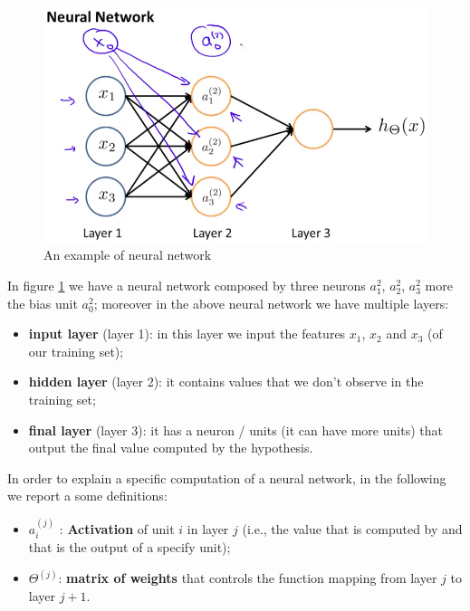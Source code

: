  
\begin{figure}[H]
\begin{center}
\includegraphics[scale=0.25]{images/neurnet}
\end{center}
\caption{An example of neural network} 
\label{fig:neurnet}
\end{figure}

In figure \ref{fig:neurnet} we have a neural network composed by three neurons $a_1^{2}$, $a_2^{2}$, $a_3^{2}$  more the bias unit $a_0^{2}$; moreover in the above neural network we have multiple layers:

\begin{itemize}
\item {\bf input layer} (layer 1): in this layer we input the features $x_1$, $x_2$ and $x_3$ (of our training set);
\item {\bf hidden layer} (layer 2): it contains values that we don't observe in the training set;
\item {\bf final layer} (layer 3): it has a neuron / units (it can have more units) that output the final value computed by the hypothesis.
\end{itemize}

In order to explain a specific computation of a neural network, in the following we report a some definitions:
\begin{itemize}
\item {\bf $a_i^{(j)}$} : {\bf Activation} of unit $i$ in layer $j$ (i.e., the value that is computed by and that is the output of a specify unit);
\item {\bf $\Theta^{(j)}$}: {\bf matrix of weights} that controls the function mapping from layer $j$ to layer $j+1$.
\end{itemize}


